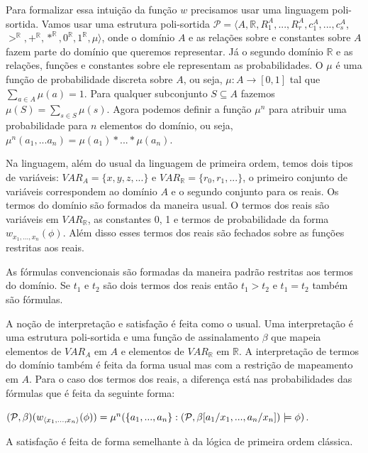 Para formalizar essa intuição da função $w$ precisamos usar uma linguagem poli-sortida. Vamos usar uma estrutura poli-sortida $\mathcal{P} = \langle A, \mathbb{R},  R_{1}^{A}, ..., R_{r}^{A}, c_1^{A}, ..., c_s^{A}$, $ >^{\mathbb{R}}, +^{\mathbb{R}}, *^{\mathbb{R}}, 0^{\mathbb{R}}, 1^{\mathbb{R}}, \mu \rangle$, onde o domínio $A$ e as relações sobre e constantes sobre $A$ fazem parte do domínio que queremos representar. Já o segundo domínio $\mathbb{R}$ e as relações, funções e constantes sobre ele representam as probabilidades. O $\mu$ é uma função de probabilidade discreta sobre $A$, ou seja, $\mu : A \to [0, 1]$ tal que $\sum_{a \in A}\mu(a) = 1$. Para qualquer subconjunto $S \subseteq A$ fazemos $\mu(S) = \sum_{s \in S}\mu(s)$. Agora podemos definir a função $\mu^n$ para atribuir uma probabilidade para $n$ elementos do domínio, ou seja, $\mu^n(a_1, ... a_n) = \mu(a_1)*...*\mu(a_n)$.

Na linguagem, além do usual da linguagem de primeira ordem, temos dois tipos de variáveis: $VAR_A = \{x, y, z, ...\}$ e $VAR_{\mathbb{R}} = \{r_0, r_1, ... \}$, o primeiro conjunto de variáveis correspondem ao domínio $A$ e o segundo conjunto para os reais. Os termos do domínio são formados da maneira usual. O termos dos reais são variáveis em $VAR_{\mathbb{R}}$, as constantes 0, 1 e termos de probabilidade da forma $w_{x_1,...,x_n}(\phi)$. Além disso esses termos dos reais são fechados sobre as funções restritas aos reais. 

As fórmulas convencionais são formadas da maneira padrão restritas aos termos do domínio. Se $t_1$ e $t_2$ são dois termos dos reais então $t_1 > t_2$ e $t_1 = t_2$ também são fórmulas. 

A noção de interpretação e satisfação é feita como o usual. Uma interpretação é uma estrutura poli-sortida e uma função de assinalamento $\beta$ que mapeia elementos de $VAR_A$ em $A$ e elementos de $VAR_{\mathbb{R}}$ em $\mathbb{R}$.
A interpretação de termos do domínio também é feita da forma usual mas com a restrição de mapeamento em $A$. Para o caso dos termos dos reais, a diferença está nas probabilidades das fórmulas que é feita da seguinte forma:
\begin{center}
$(\mathcal{P}, \beta)(w_{\left \langle x_1,..., x_n \right \rangle }(\phi)) = \mu^n(\{a_1, ..., a_n  \} : (\mathcal{P}, \beta[a_1/x_1, ..., a_n/x_n]) \models \phi)$. 
\end{center} 

A satisfação é feita de forma semelhante à da lógica de primeira ordem clássica.

